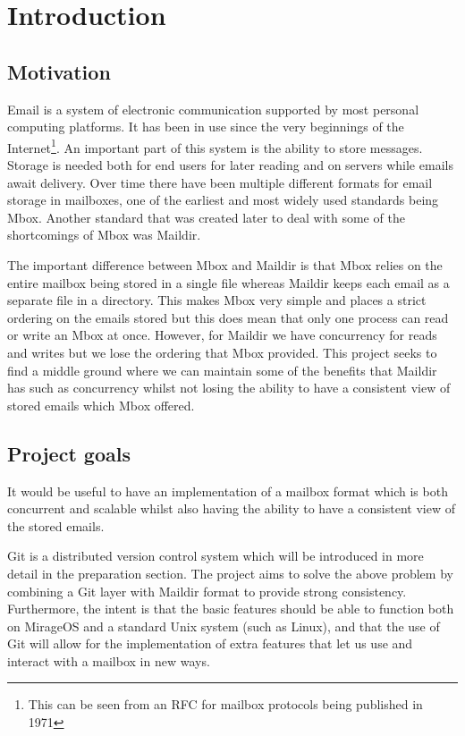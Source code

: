 \chapter{Introduction}

\section{Motivation}

Email is a system of electronic communication supported by most personal computing platforms. It has been in use since the very beginnings of the Internet\footnote{This can be seen from an RFC for mailbox protocols being published in 1971\cite{rfc196}}. An important part of this system is the ability to store messages. Storage is needed both for end users for later reading and on servers while emails await delivery. Over time there have been multiple different formats for email storage in mailboxes, one of the earliest and most widely used standards being Mbox. Another standard that was created later to deal with some of the shortcomings of Mbox was Maildir.

The important difference between Mbox and Maildir is that Mbox relies on the entire mailbox being stored in a single file whereas Maildir keeps each email as a separate file in a directory. This makes Mbox very simple and places a strict ordering on the emails stored but this does mean that only one process can read or write an Mbox at once. However, for Maildir we have concurrency for reads and writes but we lose the ordering that Mbox provided. This project seeks to find a middle ground where we can maintain some of the benefits that Maildir has such as concurrency whilst not losing the ability to have a consistent view of stored emails which Mbox offered.

\section{Project goals}

It would be useful to have an implementation of a mailbox format which is both concurrent and scalable whilst also having the ability to have a consistent view of the stored emails.

Git is a distributed version control system which will be introduced in more detail in the preparation section. The project aims to solve the above problem by combining a Git layer with Maildir format to provide strong consistency. Furthermore, the intent is that the basic features should be able to function both on MirageOS and a standard Unix system (such as Linux), and that the use of Git will allow for the implementation of extra features that let us use and interact with a mailbox in new ways.

